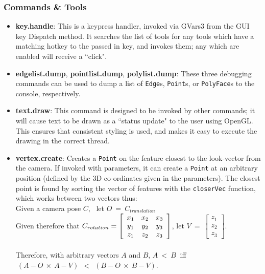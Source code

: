 \documentclass[a4paper,10pt]{article}
\begin{document}
\subsubsection{Commands \& Tools}
\label{cmdTools}
\begin{itemize}
\item{\textbf{key.handle}: This is a keypress handler, invoked via GVars3 from the GUI key Dispatch method. It searches the list of tools for any tools which have a matching hotkey to the passed in key, and invokes them; any which are enabled will receive a ``click".}
\item{\textbf{edgelist.dump}, \textbf{pointlist.dump}, \textbf{polylist.dump}: These three debugging commands can be used to dump a list of \texttt{Edge}s, \texttt{Point}s, or \texttt{PolyFace}s to the console, respectively.}
\item{\textbf{text.draw}: This command is designed to be invoked by other commands; it will cause text to be drawn as a ``status update" to the user using OpenGL. This ensures that consistent styling is used, and makes it easy to execute the drawing in the correct thread.}
\item{\textbf{vertex.create}: Creates a \texttt{Point} on the feature closest to the look-vector from the camera. If invoked with parameters, it can create a \texttt{Point} at an arbitrary position (defined by the 3D co-ordinates given in the parameters). The closest point is found by sorting the vector of features with the \texttt{closerVec} function, which works between two vectors thus: 
\\

Given a camera pose $C$, ~let $O ~=~ C_{translation}$
\\

Given therefore that $C_{rotation} = \left[
  \begin{array}{c c c}
    x_1 & x_2 & x_3 \\
    y_1 & y_2 & y_3 \\
    z_1 & z_2 & z_3
  \end{array}\right]$, let $V ~=~ \left[ 
  \begin{array}{c}
    z_1 \\ 
    z_2 \\ 
    z_3 
  \end{array}\right]$.
\\ \\
  
Therefore, with arbitrary vectors $A$ and $B$, $A ~<~ B~$ iff \\$~(A - O ~\times~ A - V) ~~<~~ (B - O ~\times~ B - V)$. \\
}


\end{itemize}
\end{document}
